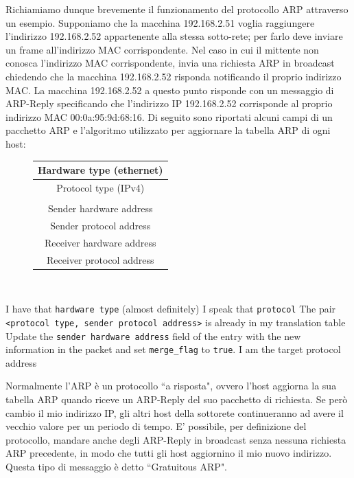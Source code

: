 Richiamiamo dunque brevemente il funzionamento del protocollo ARP attraverso un esempio. Supponiamo che la macchina 192.168.2.51 voglia raggiungere l'indirizzo 192.168.2.52 appartenente alla stessa sotto-rete; per farlo deve inviare un frame all'indirizzo MAC corrispondente. Nel caso in cui il mittente non conosca l'indirizzo MAC corrispondente, invia una richiesta ARP in broadcast chiedendo che la macchina 192.168.2.52 risponda notificando il proprio indirizzo MAC. La macchina 192.168.2.52 a questo punto risponde con un messaggio di ARP-Reply specificando che l'indirizzo IP 192.168.2.52 corrisponde al proprio indirizzo MAC 00:0a:95:9d:68:16. Di seguito sono riportati alcuni campi di un pacchetto ARP e l'algoritmo utilizzato per aggiornare la tabella ARP di ogni host:
\begin{figure}[htbp]
	\centering
	\begin{tabular}{|c|}
		\hline
		Hardware type (ethernet) \\
		\hline
		Protocol type (IPv4) \\
		\hline
		[$\dots$] \\
		\hline
		Sender hardware address \\
		\hline
		Sender protocol address \\
		\hline
		Receiver hardware address \\
		\hline
		Receiver protocol address \\ \hline
	\end{tabular}
\end{figure}\\
\begin{codebox}
\li \If I have that \texttt{hardware type} (almost definitely)
\li \Then \If I speak that \texttt{protocol}
\li \Then \If The pair \texttt{<protocol type, sender protocol address>} is already in my translation table
\li \Then Update the \texttt{sender hardware address} field of the entry with the new information
\li in the packet and set \texttt{merge\_flag} to \texttt{true}.
\li \If I am the target protocol address
\li \Then [$\dots$] \End \End \End \End
\end{codebox}
Normalmente l'ARP è un protocollo \textquotedblleft a risposta", ovvero l'host aggiorna la sua tabella ARP quando riceve un ARP-Reply del suo pacchetto di richiesta. Se però cambio il mio indirizzo IP, gli altri host della sottorete continueranno ad avere il vecchio valore per un periodo di tempo. E' possibile, per definizione del protocollo, mandare anche degli ARP-Reply in broadcast senza nessuna richiesta ARP precedente, in modo che tutti gli host aggiornino il mio nuovo indirizzo. Questa tipo di messaggio è detto  \textquotedblleft Gratuitous ARP".\\

